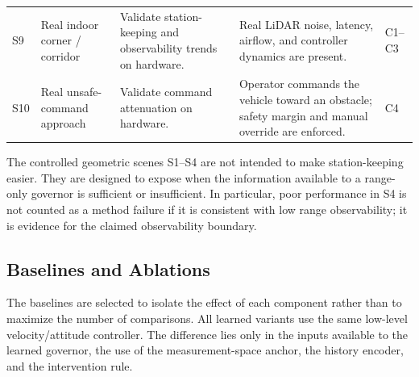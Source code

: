 \documentclass[11pt]{article}
\begin{document}
\begin{table}[t]
\begin{tabular}{L{0.08\textwidth}L{0.18\textwidth}L{0.28\textwidth}L{0.30\textwidth}L{0.08\textwidth}}
S9 & Real indoor corner / corridor & Validate station-keeping and observability trends on hardware. & Real LiDAR noise, latency, airflow, and controller dynamics are present. & C1--C3 \\
S10 & Real unsafe-command approach & Validate command attenuation on hardware. & Operator commands the vehicle toward an obstacle; safety margin and manual override are enforced. & C4 \\
\bottomrule
\end{tabular}
\end{table}

The controlled geometric scenes S1--S4 are not intended to make station-keeping
easier.  They are designed to expose when the information available to a
range-only governor is sufficient or insufficient.  In particular, poor
performance in S4 is not counted as a method failure if it is consistent with
low range observability; it is evidence for the claimed observability boundary.

\subsection{Baselines and Ablations}
\label{sec:exp_baselines}

The baselines are selected to isolate the effect of each component rather than
to maximize the number of comparisons.  All learned variants use the same
low-level velocity/attitude controller.  The difference lies only in the inputs
available to the learned governor, the use of the measurement-space anchor, the
history encoder, and the intervention rule.
\end{document}
